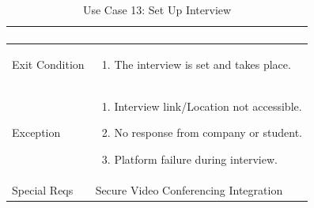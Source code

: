 \begin{table}[H]
\begin{tabular}{|l|p{12cm}|}
\begin{enumerate}
    \end{enumerate} \\ \hline
    Exit Condition   & 
    \begin{enumerate}
        \item The interview is set and takes place.
    \end{enumerate} \\ \hline
    Exception        & 
    \begin{enumerate}
        \item Interview link/Location not accessible.
        \item No response from company or student.
        \item Platform failure during interview.
\end{enumerate} \\ \hline
Special Reqs     & Secure Video Conferencing Integration\\ \hline
\end{tabular}
\caption{Use Case 13: Set Up Interview}
\label{tab:user_signup}
\end{table}


